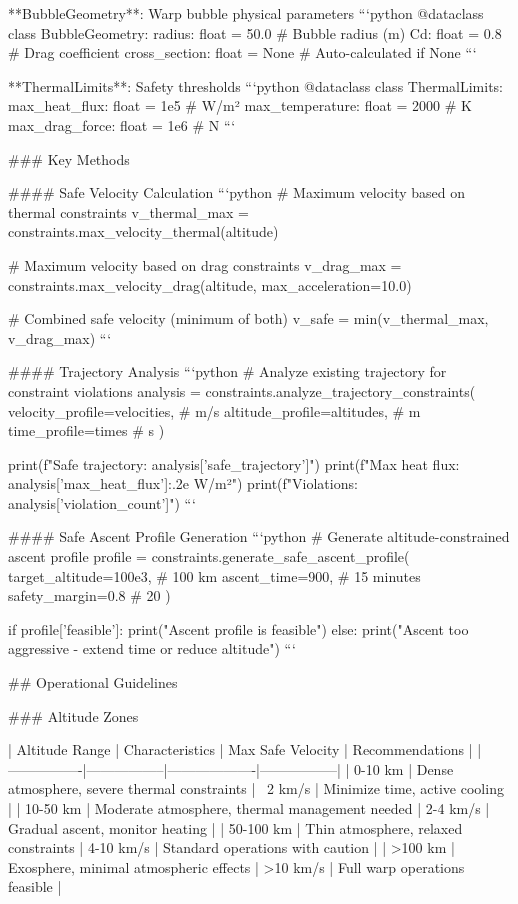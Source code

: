 **BubbleGeometry**: Warp bubble physical parameters
```python
@dataclass
class BubbleGeometry:
    radius: float = 50.0       # Bubble radius (m)
    Cd: float = 0.8           # Drag coefficient
    cross_section: float = None # Auto-calculated if None
```

**ThermalLimits**: Safety thresholds
```python
@dataclass
class ThermalLimits:
    max_heat_flux: float = 1e5     # W/m²
    max_temperature: float = 2000   # K
    max_drag_force: float = 1e6     # N
```

### Key Methods

#### Safe Velocity Calculation
```python
# Maximum velocity based on thermal constraints
v_thermal_max = constraints.max_velocity_thermal(altitude)

# Maximum velocity based on drag constraints  
v_drag_max = constraints.max_velocity_drag(altitude, max_acceleration=10.0)

# Combined safe velocity (minimum of both)
v_safe = min(v_thermal_max, v_drag_max)
```

#### Trajectory Analysis
```python
# Analyze existing trajectory for constraint violations
analysis = constraints.analyze_trajectory_constraints(
    velocity_profile=velocities,    # m/s
    altitude_profile=altitudes,     # m
    time_profile=times             # s
)

print(f"Safe trajectory: {analysis['safe_trajectory']}")
print(f"Max heat flux: {analysis['max_heat_flux']:.2e} W/m²")
print(f"Violations: {analysis['violation_count']}")
```

#### Safe Ascent Profile Generation
```python
# Generate altitude-constrained ascent profile
profile = constraints.generate_safe_ascent_profile(
    target_altitude=100e3,    # 100 km
    ascent_time=900,          # 15 minutes
    safety_margin=0.8         # 20%
)

if profile['feasible']:
    print("Ascent profile is feasible")
else:
    print("Ascent too aggressive - extend time or reduce altitude")
```

## Operational Guidelines

### Altitude Zones

| Altitude Range | Characteristics | Max Safe Velocity | Recommendations |
|----------------|-----------------|-------------------|-----------------|
| 0-10 km | Dense atmosphere, severe thermal constraints | ~2 km/s | Minimize time, active cooling |
| 10-50 km | Moderate atmosphere, thermal management needed | 2-4 km/s | Gradual ascent, monitor heating |
| 50-100 km | Thin atmosphere, relaxed constraints | 4-10 km/s | Standard operations with caution |
| >100 km | Exosphere, minimal atmospheric effects | >10 km/s | Full warp operations feasible |


